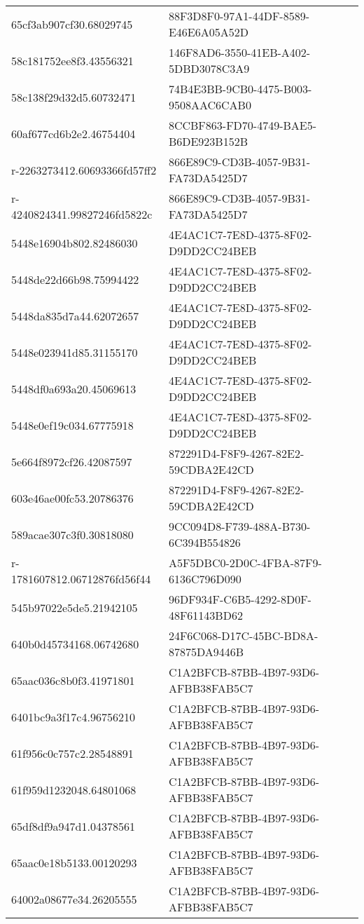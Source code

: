\begin{tabular}{ll}
65cf3ab907cf30.68029745 & 88F3D8F0-97A1-44DF-8589-E46E6A05A52D \\
58c181752ee8f3.43556321 & 146F8AD6-3550-41EB-A402-5DBD3078C3A9 \\
58c138f29d32d5.60732471 & 74B4E3BB-9CB0-4475-B003-9508AAC6CAB0 \\
60af677cd6b2e2.46754404 & 8CCBF863-FD70-4749-BAE5-B6DE923B152B \\
r-2263273412.60693366fd57ff2 & 866E89C9-CD3B-4057-9B31-FA73DA5425D7 \\
r-4240824341.99827246fd5822c & 866E89C9-CD3B-4057-9B31-FA73DA5425D7 \\
5448e16904b802.82486030 & 4E4AC1C7-7E8D-4375-8F02-D9DD2CC24BEB \\
5448de22d66b98.75994422 & 4E4AC1C7-7E8D-4375-8F02-D9DD2CC24BEB \\
5448da835d7a44.62072657 & 4E4AC1C7-7E8D-4375-8F02-D9DD2CC24BEB \\
5448e023941d85.31155170 & 4E4AC1C7-7E8D-4375-8F02-D9DD2CC24BEB \\
5448df0a693a20.45069613 & 4E4AC1C7-7E8D-4375-8F02-D9DD2CC24BEB \\
5448e0ef19c034.67775918 & 4E4AC1C7-7E8D-4375-8F02-D9DD2CC24BEB \\
5e664f8972cf26.42087597 & 872291D4-F8F9-4267-82E2-59CDBA2E42CD \\
603e46ae00fc53.20786376 & 872291D4-F8F9-4267-82E2-59CDBA2E42CD \\
589acae307c3f0.30818080 & 9CC094D8-F739-488A-B730-6C394B554826 \\
r-1781607812.06712876fd56f44 & A5F5DBC0-2D0C-4FBA-87F9-6136C796D090 \\
545b97022e5de5.21942105 & 96DF934F-C6B5-4292-8D0F-48F61143BD62 \\
640b0d45734168.06742680 & 24F6C068-D17C-45BC-BD8A-87875DA9446B \\
65aac036c8b0f3.41971801 & C1A2BFCB-87BB-4B97-93D6-AFBB38FAB5C7 \\
6401bc9a3f17c4.96756210 & C1A2BFCB-87BB-4B97-93D6-AFBB38FAB5C7 \\
61f956c0c757c2.28548891 & C1A2BFCB-87BB-4B97-93D6-AFBB38FAB5C7 \\
61f959d1232048.64801068 & C1A2BFCB-87BB-4B97-93D6-AFBB38FAB5C7 \\
65df8df9a947d1.04378561 & C1A2BFCB-87BB-4B97-93D6-AFBB38FAB5C7 \\
65aac0e18b5133.00120293 & C1A2BFCB-87BB-4B97-93D6-AFBB38FAB5C7 \\
64002a08677e34.26205555 & C1A2BFCB-87BB-4B97-93D6-AFBB38FAB5C7 \\

\end{tabular}
